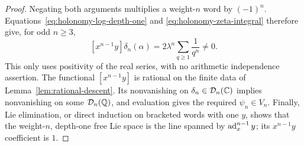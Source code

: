\begin{proof}
Negating both arguments multiplies a weight-$n$ word by $(-1)^n$.
Equations~\eqref{eq:holonomy-log-depth-one} and
\eqref{eq:holonomy-zeta-integral} therefore give, for odd $n\geq3$,
\begin{equation}\label{eq:holonomy-nonzero-odd}
 [x^{n-1}y]\delta_n(\alpha)
 =2\lambda^n\sum_{q\geq1}\frac1{q^n}\ne0.
\end{equation}
This only uses positivity of the real series, with no arithmetic
independence assertion.  The functional $[x^{n-1}y]$ is rational on
the finite data of Lemma~\ref{lem:rational-descent}.  Its nonvanishing
on $\delta_n\in\mathcal D_n(\mathbb C)$ implies nonvanishing on some
$\mathcal D_n(\mathbb Q)$, and evaluation gives the required $\psi_n\in V_n$.
Finally, Lie elimination, or direct induction on bracketed words with
one $y$, shows that the weight-$n$, depth-one free Lie space is the
line spanned by $\operatorname{ad}_x^{n-1}y$; its $x^{n-1}y$ coefficient is $1$.
\end{proof}
